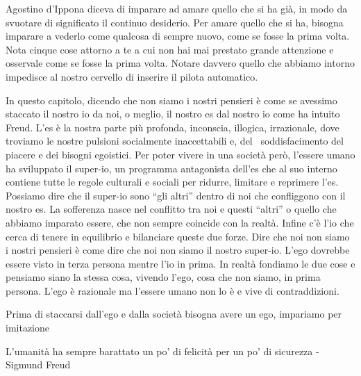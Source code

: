 \documentclass[12pt]{book} %
\begin{document}
Agostino d'Ippona diceva di imparare ad amare quello che si ha già, in modo da svuotare di significato il continuo
desiderio. Per amare quello che si ha, bisogna imparare a vederlo come qualcosa di sempre nuovo, come se fosse la prima
volta. Nota cinque cose attorno a te a cui non hai mai prestato grande attenzione e osservale come se fosse la prima
volta. Notare davvero quello che abbiamo intorno impedisce al nostro cervello di inserire il pilota automatico. 

In questo capitolo, dicendo che non siamo i nostri pensieri è come se avessimo staccato il nostro io da noi, o meglio,
il nostro es dal nostro io come ha intuito Freud. L'es è la nostra parte più profonda, inconscia,
illogica, irrazionale, dove troviamo le nostre pulsioni socialmente inaccettabili e, del \ soddisfacimento del piacere
e dei bisogni egoistici. Per poter vivere in una società però, l'essere umano ha sviluppato il
super-io, un programma antagonista dell'es che al suo interno contiene tutte le regole culturali e
sociali per ridurre, limitare e reprimere l'es. Possiamo dire che il super-io sono “gli altri”
dentro di noi che confliggono con il nostro es. La sofferenza nasce nel conflitto tra noi e questi “altri” o quello che
abbiamo imparato essere, che non sempre coincide con la realtà. Infine c'è
l'io che cerca di tenere in equilibrio e bilanciare queste due forze. Dire che noi non siamo i
nostri pensieri è come dire che noi non siamo il nostro super-io. L'ego dovrebbe essere visto in terza persona mentre
l'io in prima. In realtà fondiamo le due cose e pensiamo siano la stessa cosa, vivendo l'ego, cosa che non siamo, in
prima persona. L'ego è razionale ma l'essere umano non lo è e vive di contraddizioni. 

Prima di staccarsi dall'ego e dalla società bisogna avere un ego, impariamo per imitazione

L'umanità ha sempre barattato un po' di felicità per un po' di sicurezza - Sigmund Freud
\end{document}

